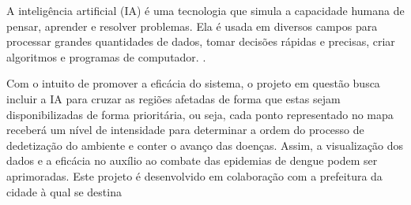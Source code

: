 A inteligência artificial (IA) é uma tecnologia que simula a capacidade humana de pensar, aprender e resolver problemas. Ela é usada em diversos campos para processar grandes quantidades de dados, tomar decisões rápidas e precisas, criar algoritmos e programas de computador. \cite{24}.

Com o intuito de promover a eficácia do sistema, o projeto em questão busca incluir a IA para cruzar as regiões afetadas de forma que estas sejam disponibilizadas de forma prioritária, ou seja, cada ponto representado no mapa receberá um nível de intensidade para determinar a ordem do processo de dedetização do ambiente e conter o avanço das doenças. Assim, a visualização dos dados e a eficácia no auxílio ao combate das epidemias de dengue podem ser aprimoradas. Este projeto é desenvolvido em colaboração com a prefeitura da cidade à qual se destina


